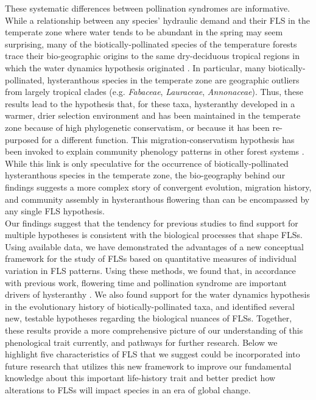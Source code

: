 \documentclass[12pt]{article}
\begin{document}
\noindent These systematic differences between pollination syndromes are informative. While a relationship between any species' hydraulic demand and their FLS in the temperate zone where water tends to be abundant in the spring \citep{Polgar2011} may seem surprising, many of the biotically-pollinated species of the temperature forests trace their bio-geographic origins to the same dry-deciduous tropical regions \citep{Daubenmire1972} in which the water dynamics hypothesis originated \citep{Janzen1967,Franklin2016}. In particular, many biotically-pollinated, hysteranthous species in the temperate zone are geographic outliers from largely tropical clades (e.g. \textit{Fabaceae}, \textit{Lauraceae}, \textit{Annonaceae}). Thus, these results lead to the hypothesis that, for these taxa, hysteranthy developed in a warmer, drier selection environment and has been maintained in the temperate zone because of high phylogenetic conservatism, or because it has been re-purposed for a different function. 
This migration-conservatism hypothesis has been invoked to explain community phenology patterns in other forest systems \citep[i.e. general flowering in dipterocarps,][]{Kurten2018}. While this link is only speculative for the occurrence of biotically-pollinated hysteranthous species in the temperate zone, the bio-geography behind our findings suggests a more complex story of convergent evolution, migration history, and community assembly in hysteranthous flowering than can be encompassed by any single FLS hypothesis.\\

\noindent Our findings suggest that the tendency for previous studies to find support for multiple hypotheses \citep{Bolmgren2003,Gougherty2018,Savage2019} is consistent with the biological processes that shape FLSs. Using available data, we have demonstrated the advantages of a new conceptual framework for the study of FLSs based on quantitative measures of individual variation in FLS patterns. Using these methods, we found that, in accordance with previous work, flowering time and pollination syndrome are important drivers of hysteranthy \citep{Gougherty2018}. We also found support for the water dynamics hypothesis in the evolutionary history of biotically-pollinated taxa, and identified several new, testable hypotheses regarding the biological nuances of FLSs. Together, these results provide a more comprehensive picture of our understanding of this phenological trait currently, and pathways for further research. Below we highlight five characteristics of FLS that we suggest could be incorporated into future research that utilizes this new framework to improve our fundamental knowledge about this important life-history trait and better predict how alterations to FLSs will impact species in an era of global change.\\
\end{document}
